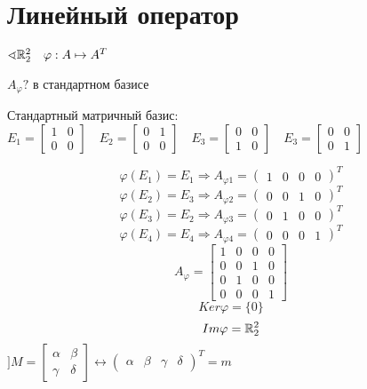 

\cfoot{}

\usepackage{mathrsfs}



\section{Линейный оператор}

\begin{example}
    $\sphericalangle \mathbb{R}^2_2 \quad \varphi : A\mapsto A^T$

    $A_\varphi?$ в стандартном базисе

    Стандартный матричный базис: $E_1=\begin{bmatrix}
        1 & 0 \\
        0 & 0
    \end{bmatrix} \quad E_2=\begin{bmatrix}
        0 & 1 \\
        0 & 0
    \end{bmatrix} \quad E_3 = \begin{bmatrix}
        0 & 0 \\
        1 & 0
    \end{bmatrix} \quad E_3 = \begin{bmatrix}
        0 & 0 \\
        0 & 1
    \end{bmatrix}$

    $$\varphi(E_1)=E_1 \Rightarrow A_{\varphi1}=\begin{pmatrix}
        1 & 0 & 0 & 0
    \end{pmatrix}^T$$
    $$\varphi(E_2)=E_3 \Rightarrow A_{\varphi2}=\begin{pmatrix}
        0 & 0 & 1 & 0
    \end{pmatrix}^T$$
    $$\varphi(E_3)=E_2 \Rightarrow A_{\varphi3}=\begin{pmatrix}
        0 & 1 & 0 & 0
    \end{pmatrix}^T$$
    $$\varphi(E_4)=E_4 \Rightarrow A_{\varphi4}=\begin{pmatrix}
        0 & 0 & 0 & 1
    \end{pmatrix}^T$$
    $$A_\varphi=\begin{bmatrix}
        1 & 0 & 0 & 0 \\
        0 & 0 & 1 & 0 \\
        0 & 1 & 0 & 0 \\
        0 & 0 & 0 & 1
    \end{bmatrix}$$
    $$Ker \varphi = \{0\}$$
    $$Im \varphi = \mathbb{R}_2^2$$
    $] M = \begin{bmatrix}
        \alpha & \beta \\
        \gamma & \delta
    \end{bmatrix} \leftrightarrow \begin{pmatrix}
        \alpha & \beta & \gamma & \delta
    \end{pmatrix}^T=m$
    

\end{example}
